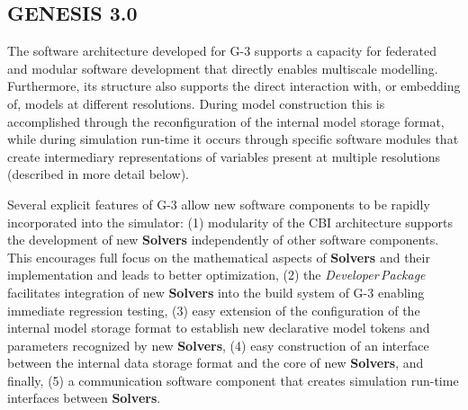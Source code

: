 \documentclass[11pt,3p,twocolumn]{JMN}
\begin{document}




\subsection{GENESIS 3.0}

The software architecture developed for G-3 supports a capacity for federated and modular software development that directly enables multiscale modelling.  Furthermore, its structure also supports the direct interaction with, or embedding of, models at different resolutions.  During model construction this is accomplished through the reconfiguration of the internal model storage format, while during simulation run-time it occurs through specific software modules that create intermediary representations of variables present at multiple resolutions (described in more detail below).

Several explicit features of G-3 allow new software components to be rapidly incorporated into the simulator: (1) modularity of the CBI architecture supports the development of new {\bf Solvers} independently of other software components. This encourages full focus on the mathematical aspects of {\bf Solvers} and their implementation and leads to better optimization, (2) the {\it Developer\,Package} facilitates integration of new {\bf Solvers} into the build system of G-3 enabling immediate regression testing, (3) easy extension of the configuration of the internal model storage format to establish new declarative model tokens and parameters recognized by new {\bf Solvers}, (4) easy construction of an interface between the internal data storage format and the core of new {\bf Solvers}, and finally, (5) a communication software component that creates simulation run-time interfaces between {\bf Solvers}.
\end{document}
